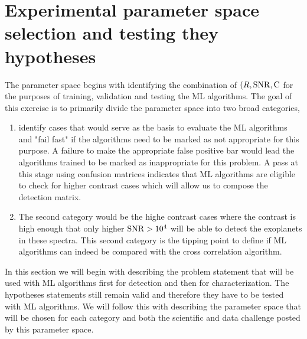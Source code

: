 \section{Experimental parameter space selection and testing they hypotheses}
The parameter space begins with identifying the combination of $(R,\rm{SNR},C$ for the purposes of training, validation and testing the ML algorithms.
The goal of this exercise is to primarily divide the parameter space into two broad categories,
\begin{enumerate}
    \item identify cases that would serve as the basis to evaluate the ML algorithms and "fail fast" if the algorithms need to be marked as not appropriate for this purpose. 
    A failure to make the appropriate false positive bar would lead the algorithms trained to be marked as inappropriate for this problem. 
    A pass at this stage using confusion matrices indicates that ML algorithms are eligible to check for higher contrast cases which will allow us to compose the detection matrix.
    \item The second category would be the highe contrast cases where the contrast is high enough that only higher $\rm{SNR}>10^{4}$ will be able to detect the exoplanets in these spectra.
    This second category is the tipping point to define if ML algorithms can indeed be compared with the cross correlation algorithm.
\end{enumerate}
In this section we will begin with describing the problem statement that will be used with ML algorithms first for detection and then for characterization.
The hypotheses statements still remain valid and therefore they have to be tested with ML algorithms.
We will follow this with describing the parameter space that will be chosen for each category and both the scientific and data challenge posted by this parameter space.
